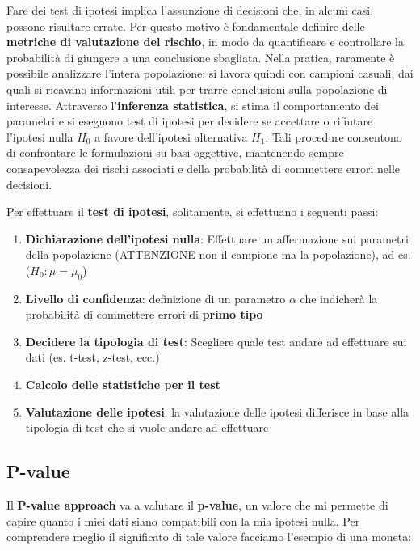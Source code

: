 Fare dei test di ipotesi implica l’assunzione di decisioni che, in alcuni casi, possono risultare errate. Per questo motivo è fondamentale definire delle \textbf{metriche di valutazione del rischio}, in modo da quantificare e controllare la probabilità di giungere a una conclusione sbagliata. Nella pratica, raramente è possibile analizzare l’intera popolazione: si lavora quindi con campioni casuali, dai quali si ricavano informazioni utili per trarre conclusioni sulla popolazione di interesse. Attraverso l’\textbf{inferenza statistica}, si stima il comportamento dei parametri e si eseguono test di ipotesi per decidere se accettare o rifiutare l’ipotesi nulla \(H_0\) a favore dell’ipotesi alternativa \(H_1\). Tali procedure consentono di confrontare le formulazioni su basi oggettive, mantenendo sempre consapevolezza dei rischi associati e della probabilità di commettere errori nelle decisioni.

Per effettuare il \textbf{test di ipotesi}, solitamente, si effettuano i seguenti passi:
\begin{enumerate}
    \item \textbf{Dichiarazione dell'ipotesi nulla}: Effettuare un affermazione sui parametri della popolazione (ATTENZIONE non il campione ma la popolazione), ad es. (\(H_0: \mu = \mu_0\))
    \item \textbf{Livello di confidenza}: definizione di un parametro \(\alpha\) che indicherà la probabilità di commettere errori di \textbf{primo tipo}
    \item \textbf{Decidere la tipologia di test}: Scegliere quale test andare ad effettuare sui dati (es. t-test, z-test, ecc.)
    \item \textbf{Calcolo delle statistiche per il test}
    \item \textbf{Valutazione delle ipotesi}: la valutazione delle ipotesi differisce in base alla tipologia di test che si vuole andare ad effettuare
\end{enumerate}

\subsection{P-value}
Il \textbf{P-value approach} va a valutare il \textbf{p-value}, un valore che mi permette di capire quanto i miei dati siano compatibili con la mia ipotesi nulla. Per comprendere meglio il significato di tale valore facciamo l'esempio di una moneta:

